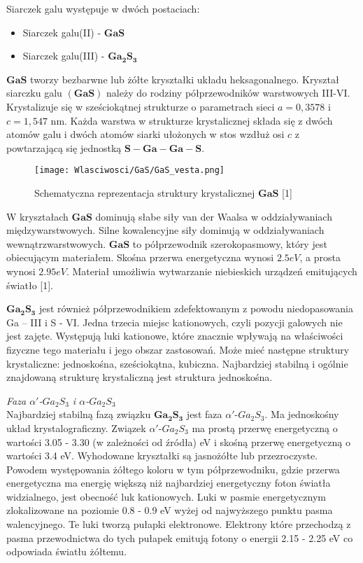Siarczek galu występuje w dwóch postaciach:
\begin{itemize}
	\item Siarczek galu(II) - $\mathbf{GaS}$
	\item Siarczek galu(III) - $\mathbf{Ga_{2}S_{3}}$
\end{itemize}
$\mathbf{GaS}$ tworzy bezbarwne lub żółte kryształki układu heksagonalnego. Kryształ siarczku galu $\mathbf{(GaS)}$ należy do rodziny półprzewodników warstwowych III-VI. Krystalizuje się w sześciokątnej strukturze o parametrach sieci $a = 0,3578$ i $c = 1,547$ nm. Każda warstwa w strukturze krystalicznej składa się z dwóch atomów galu i dwóch atomów siarki ułożonych w stos wzdłuż osi $c$ z powtarzającą się jednostką $\mathbf{S-Ga-Ga-S}$.
\begin{figure}[H]
	\begin{center}
		\texttt{[image: Wlasciwosci/GaS/GaS\_vesta.png]}
		\caption{Schematyczna reprezentacja struktury krystalicznej $\mathbf{GaS}$ [1]}
	\end{center}
\end{figure}

W kryształach $\mathbf{GaS}$ dominują słabe siły van der Waalsa w oddziaływaniach międzywarstwowych. Silne kowalencyjne siły dominują w oddziaływaniach wewnątrzwarstwowych.
$\mathbf{GaS}$ to półprzewodnik szerokopasmowy, który jest obiecującym materiałem. Skośna przerwa energetyczna wynosi $2.5eV$, a prosta wynosi $2.95eV$. Materiał umożliwia
wytwarzanie niebieskich urządzeń emitujących światło [1].

$\mathbf{Ga_{2}S_{3}}$ jest również półprzewodnikiem zdefektowanym z powodu niedopasowania Ga – III i S - VI. Jedna trzecia miejsc kationowych, czyli pozycji galowych nie jest zajęte. Występują luki kationowe, które znacznie wpływają na właściwości fizyczne tego materiału i jego obszar zastosowań. Może mieć następne struktury krystaliczne: jednoskośna, sześciokątna, kubiczna. Najbardziej stabilną i ogólnie znajdowaną strukturę krystaliczną jest struktura jednoskośna.

\textit{Faza $\alpha'$-$Ga_{2}S_{3}$ i $\alpha$-$Ga_{2}S_{3}$} \\
Najbardziej stabilną fazą związku $\mathbf{Ga_{2}S_{3}}$ jest faza $\alpha'$-$Ga_{2}S_{3}$. Ma jednoskośny układ krystalograficzny. Związek $\alpha'$-$Ga_{2}S_{3}$ ma prostą przerwę energetyczną o wartości 3.05 - 3.30 (w zależności od źródła) eV i skośną przerwę energetyczną o wartości 3.4 eV. Wyhodowane kryształki są jasnożółte lub przezroczyste. Powodem występowania żółtego koloru w tym półprzewodniku, gdzie przerwa energetyczna ma energię większą niż najbardziej energetyczny foton światła widzialnego, jest obecność luk kationowych. Luki w pasmie energetycznym zlokalizowane na poziomie 0.8 - 0.9 eV wyżej od najwyższego punktu pasma walencyjnego. Te luki tworzą pułapki elektronowe. Elektrony które przechodzą z pasma przewodnictwa do tych pułapek emitują fotony o energii 2.15 - 2.25 eV co odpowiada światłu żółtemu.

